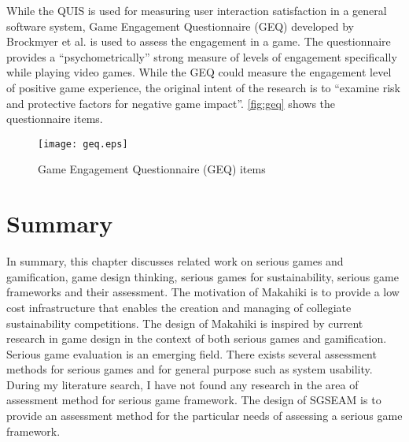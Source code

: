 While the QUIS \cite{harper1993improving} is used for measuring user interaction satisfaction in a general software system, Game Engagement Questionnaire (GEQ) \cite{brockmyer2009development} developed by Brockmyer et al. is used to assess the engagement in a game. The questionnaire provides a ``psychometrically'' strong measure of levels of engagement specifically while playing video games. While the GEQ could measure the engagement level of positive game experience, the original intent of the research is to ``examine risk and protective factors for negative game impact''. \autoref{fig:geq} shows the questionnaire items.

\begin{figure}[ht!]
	\centering
		\texttt{[image: geq.eps]}
		\caption{Game Engagement Questionnaire (GEQ) items \cite{brockmyer2009development}}
		\label{fig:geq}
\end{figure}

\section{Summary}
\label{sec:rel-summary}

In summary, this chapter discusses related work on serious games and gamification, game design thinking, serious games for sustainability, serious game frameworks and their assessment. The motivation of  Makahiki is to provide a low cost infrastructure that enables the creation and managing of collegiate sustainability competitions. The design of Makahiki is inspired by current research in game design in the context of both serious games and gamification. Serious game evaluation is an emerging field. There exists several assessment methods for serious games and for general purpose such as system usability. During my literature search, I have not found any research in the area of assessment method for serious game framework. The design of SGSEAM is to provide an assessment method for the particular needs of assessing a serious game framework.